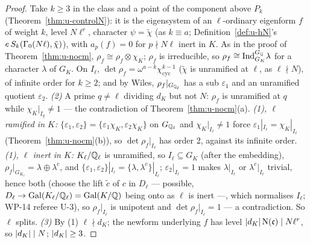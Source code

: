 \documentclass[11pt]{article}
\newcommand{\Pk}[1]{P_{#1}}                       %
\newcommand{\Ql}{\Q_\ell}
\begin{document}
\begin{proof}
Take $k\ge3$ in the class and a point of the component above $\Pk{k}$ (Theorem~\ref{thm:u-controlN}): it is the eigensystem of an $\ell$-ordinary eigenform $f$ of weight $k$,
level $N\ell^{r}$, character $\psi=\tilde\chi$ (as $k\equiv a$; Definition~\ref{def:u-hN}'s $e\,S_k(\Gamma_0(N\ell),\tilde\chi)$), with $a_p(f)=0$ for $p\nmid N\ell$ inert in $K$. As in the proof of Theorem~\ref{thm:u-nocm},
$\rho_f\cong\rho_f\otimes\chi_K$; $\rho_f$ is irreducible, so $\rho_f\cong\mathrm{Ind}_{G_K}^{G_{\mathbb{Q}}}\lambda$ for a character $\lambda$ of $G_K$. On $I_\ell$,
$\det\rho_f=\omega^{a-k}\chi_{\mathrm{cyc}}^{k-1}$ ($\tilde\chi$ is unramified at $\ell$, as $\ell\nmid N$), of infinite order for $k\ge2$; and by Wiles,
$\rho_f|_{G_{\Ql}}$ has a sub $\varepsilon_1$ and an unramified quotient $\varepsilon_2$.
\emph{(2)} A prime $q\ne\ell$ dividing $d_K$ but not $N$: $\rho_f$ is unramified at $q$ while $\chi_K|_{I_q}\ne1$ --- the contradiction of
Theorem~\ref{thm:u-nocm}(a).
\emph{(1), $\ell$ ramified in $K$:} $\{\varepsilon_1,\varepsilon_2\}=\{\varepsilon_1\chi_K,\varepsilon_2\chi_K\}$ on $G_{\Ql}$ and $\chi_K|_{I_\ell}\ne1$ force
$\varepsilon_1|_{I_\ell}=\chi_K|_{I_\ell}$ (Theorem~\ref{thm:u-nocm}(b)), so $\det\rho_f|_{I_\ell}$ has order $2$, against its infinite order.
\emph{(1), $\ell$ inert in $K$:} $K_\ell/\Ql$ is unramified, so $I_\ell\subseteq G_{K}$ (after the embedding), $\rho_f|_{G_{K_\ell}}=\lambda\oplus\lambda^{c}$, and
$\{\varepsilon_1,\varepsilon_2\}|_{I_\ell}=\{\lambda,\lambda^{c}\}|_{I_\ell}$; $\varepsilon_2|_{I_\ell}=1$ makes $\lambda|_{I_\ell}$ or $\lambda^{c}|_{I_\ell}$ trivial, hence both (choose the lift $\tilde c$ of $c$ in $D_\ell$ --- possible, $D_\ell\to\mathrm{Gal}(K_\ell/\Ql)=\mathrm{Gal}(K/\Q)$ being onto as $\ell$ is inert ---, which
normalises $I_\ell$; WP-14 referee U-3), so $\rho_f|_{I_\ell}$ is unipotent and $\det\rho_f|_{I_\ell}=1$ --- a contradiction. So $\ell$ splits.
\emph{(3)} By (1) $\ell\nmid d_K$; the newform underlying $f$ has level $\left| d_K \right|\mathrm{N}(\mathfrak c)\mid N\ell^{r}$, so $\left| d_K \right|\mid N$; $\left| d_K \right|\ge3$.
\end{proof}
\end{document}
